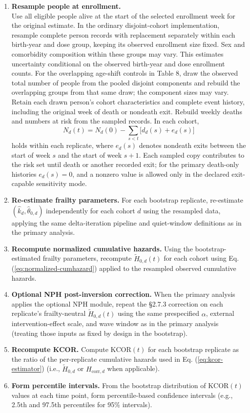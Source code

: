 \documentclass[
]{article}
\begin{document}
\begin{enumerate}
\def\labelenumi{\arabic{enumi}.}
\item
  \textbf{Resample people at enrollment.}\\
  Use all eligible people alive at the start of the selected enrollment week for the original estimate. In the ordinary disjoint-cohort implementation, resample complete person records with replacement separately within each birth-year and dose group, keeping its observed enrollment size fixed. Sex and comorbidity composition within these groups may vary. This estimates uncertainty conditional on the observed birth-year and dose enrollment counts. For the overlapping age-shift controls in Table 8, draw the observed total number of people from the pooled disjoint components and rebuild the overlapping groups from that same draw; the component sizes may vary. Retain each drawn person's cohort characteristics and complete event history, including the original week of death or nondeath exit. Rebuild weekly deaths and numbers at risk from the sampled records. In each cohort, \[N_d(t)=N_d(0)-\sum_{s<t}\big[d_d(s)+e_d(s)\big]\] holds within each replicate, where \(e_d(s)\) denotes nondeath exits between the start of week \(s\) and the start of week \(s+1\). Each sampled copy contributes to the risk set until death or another recorded exit; for the primary death-only histories \(e_d(s)=0\), and a nonzero value is allowed only in the declared exit-capable sensitivity mode.
\item
  \textbf{Re-estimate frailty parameters.} For each bootstrap replicate, re-estimate \((\hat{k}_d,\hat{\theta}_{0,d})\) independently for each cohort \(d\) using the resampled data, applying the same delta-iteration pipeline and quiet-window definitions as in the primary analysis.
\item
  \textbf{Recompute normalized cumulative hazards.} Using the bootstrap-estimated frailty parameters, recompute \(\tilde H_{0,d}(t)\) for each cohort using Eq. (\ref{eq:normalized-cumhazard}) applied to the resampled observed cumulative hazards.
\item
  \textbf{Optional NPH post-inversion correction.} When the primary analysis applies the optional NPH module, repeat the §2.7.3 correction on each replicate's frailty-neutral \(\tilde H_{0,d}(t)\) using the same prespecified \(\alpha\), external intervention-effect scale, and wave window as in the primary analysis (treating those inputs as fixed by design in the bootstrap).
\item
  \textbf{Recompute KCOR.} Compute \(\mathrm{KCOR}(t)\) for each bootstrap replicate as the ratio of the per-replicate cumulative hazards used in Eq. (\ref{eq:kcor-estimator}) (i.e., \(\tilde H_{0,d}\) or \(H_{\mathrm{corr},d}\) when applicable).
\item
  \textbf{Form percentile intervals.} From the bootstrap distribution of \(\mathrm{KCOR}(t)\) values at each time point, form percentile-based confidence intervals (e.g., 2.5th and 97.5th percentiles for 95\% intervals).
\end{enumerate}
\end{document}
